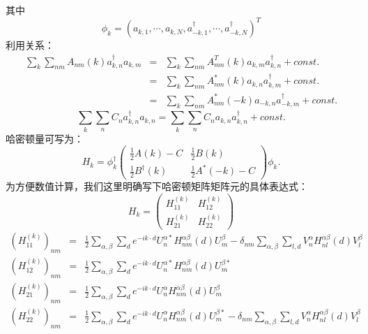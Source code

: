 \documentclass[UTF8]{ctexart}
\begin{document}
其中
\begin{equation}
\phi_{k}=\left(a_{k,1},\cdots,a_{k,N},a_{-k,1}^{\dagger},\cdots,a_{-k,N}^{\dagger}\right)^{T}
\end{equation}
利用关系：
\begin{eqnarray}
\sum_{k}\sum_{nm}A_{nm}\left(k\right)a_{k,n}^{\dagger}a_{k,m} & = & \sum_{k}\sum_{nm}A_{mn}^{T}\left(k\right)a_{k,m}a_{k,n}^{\dagger}+const.\nonumber \\
 & = & \sum_{k}\sum_{nm}A_{nm}^{*}\left(k\right)a_{k,n}a_{k,m}^{\dagger}+const.\nonumber \\
 & = & \sum_{k}\sum_{nm}A_{nm}^{*}\left(-k\right)a_{-k,n}a_{-k,m}^{\dagger}+const.
\end{eqnarray}
\begin{equation}
\sum_{k}\sum_{n}C_{n}a_{k,n}^{\dagger}a_{k,n}=\sum_{k}\sum_{n}C_{n}a_{k,n}a_{k,n}^{\dagger}+const.
\end{equation}
哈密顿量可写为：
\begin{equation}
H_{k}=\phi_{k}^{\dagger}\left(\begin{array}{cc}
\frac{1}{2}A\left(k\right)-C & \frac{1}{2}B\left(k\right)\\
\frac{1}{2}B^{\dagger}\left(k\right) & \frac{1}{2}A^{*}\left(-k\right)-C
\end{array}\right)\phi_{k}.
\end{equation}
为方便数值计算，我们这里明确写下哈密顿矩阵矩阵元的具体表达式：
\begin{equation}
H_{k}=\left(\begin{array}{cc}
H_{11}^{(k)} & H_{12}^{(k)}\\
H_{21}^{(k)} & H_{22}^{(k)}
\end{array}\right)
\end{equation}
\begin{eqnarray}
\left(H_{11}^{(k)}\right)_{nm} & = & \frac{1}{2}\sum_{\alpha,\beta}\sum_{d}e^{-ik\cdot d}U_{n}^{\alpha*}H_{nm}^{\alpha\beta}\left(d\right)U_{m}^{\beta}-\delta_{nm}\sum_{\alpha,\beta}\sum_{l,d}V_{n}^{\alpha}H_{nl}^{\alpha\beta}\left(d\right)V_{l}^{\beta}\\
\left(H_{12}^{(k)}\right)_{nm} & = & \frac{1}{2}\sum_{\alpha,\beta}\sum_{d}e^{-ik\cdot d}U_{n}^{\alpha*}H_{nm}^{\alpha\beta}\left(d\right)U_{m}^{\beta*}\\
\left(H_{21}^{(k)}\right)_{nm} & = & \frac{1}{2}\sum_{\alpha,\beta}\sum_{d}e^{-ik\cdot d}U_{n}^{\alpha}H_{nm}^{\alpha\beta}\left(d\right)U_{m}^{\beta}\\
\left(H_{22}^{(k)}\right)_{nm} & = & \frac{1}{2}\sum_{\alpha,\beta}\sum_{d}e^{-ik\cdot d}U_{n}^{\alpha}H_{nm}^{\alpha\beta}\left(d\right)U_{m}^{\beta*}-\delta_{nm}\sum_{\alpha,\beta}\sum_{l,d}V_{n}^{\alpha}H_{nl}^{\alpha\beta}\left(d\right)V_{l}^{\beta}
\end{eqnarray}
\end{document}
